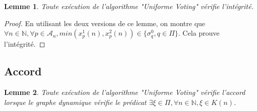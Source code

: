 \documentclass{article}
\newtheorem{lemma}{Lemme}
\begin{document}
\begin{lemma}
	Toute exécution de l'algorithme "Uniforme Voting" vérifie l'intégrité.
\end{lemma}
\begin{proof}
	En utilisant les deux versions de ce lemme, on montre que $\forall n \in \mathds{N}, \forall p \in \mathcal{A}_n, min (x^1_p(n), x^2_p(n)) \in \{\sigma^0_q, q \in \Pi\}$.
	Cela prouve l'intégrité.
\end{proof}

\subsection{Accord}

\begin{lemma}
	Toute exécution de l'algorithme "Uniforme Voting" vérifie l'accord lorsque le graphe dynamique vérifie le prédicat $\exists \xi \in \Pi, \forall n \in \mathds{N}, \xi \in K(n)$.
\end{lemma}
\end{document}

